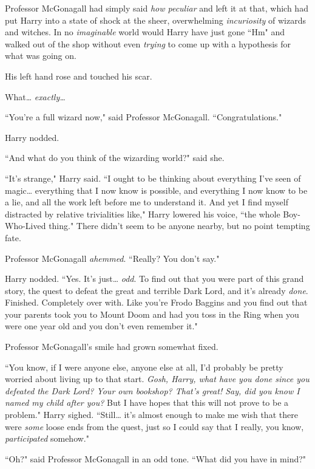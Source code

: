 Professor McGonagall had simply said \emph{how peculiar} and left it at that, which had put Harry into a state of shock at the sheer, overwhelming \emph{incuriosity} of wizards and witches. In no \emph{imaginable} world would Harry have just gone ``Hm" and walked out of the shop without even \emph{trying} to come up with a hypothesis for what was going on.

His left hand rose and touched his scar.

What{\ldots} \emph{exactly{\ldots}}

``You're a full wizard now," said Professor McGonagall. ``Congratulations."

Harry nodded.

``And what do you think of the wizarding world?" said she.

``It's strange," Harry said. ``I ought to be thinking about everything I've seen of magic{\ldots} everything that I now know is possible, and everything I now know to be a lie, and all the work left before me to understand it. And yet I find myself distracted by relative trivialities like," Harry lowered his voice, ``the whole Boy-Who-Lived thing." There didn't seem to be anyone nearby, but no point tempting fate.

Professor McGonagall \emph{ahemmed}. ``Really? You don't say."

Harry nodded. ``Yes. It's just{\ldots} \emph{odd}. To find out that you were part of this grand story, the quest to defeat the great and terrible Dark Lord, and it's already \emph{done}. Finished. Completely over with. Like you're Frodo Baggins and you find out that your parents took you to Mount Doom and had you toss in the Ring when you were one year old and you don't even remember it."

Professor McGonagall's smile had grown somewhat fixed.

``You know, if I were anyone else, anyone else at all, I'd probably be pretty worried about living up to that start. \emph{Gosh, Harry, what have you done since you defeated the Dark Lord? Your own bookshop? That's great! Say, did you know I named my child after you?} But I have hopes that this will not prove to be a problem." Harry sighed. ``Still{\ldots} it's almost enough to make me wish that there were \emph{some} loose ends from the quest, just so I could say that I really, you know, \emph{participated} somehow."

``Oh?" said Professor McGonagall in an odd tone. ``What did you have in mind?"


